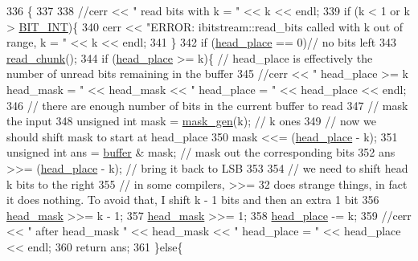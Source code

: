 \begin{DoxyCode}
336                                                 \{
337 
338   \textcolor{comment}{//cerr << " read bits with k = " << k << endl;}
339   \textcolor{keywordflow}{if} (k < 1 or k > \hyperlink{bitstream_8h_afcadf5aa65c5159bfb96c4d82ebc0a5d}{BIT\_INT})\{
340     cerr << \textcolor{stringliteral}{"ERROR: ibitstream::read\_bits called with k out of range, k = "} << k << endl;
341   \}
342   \textcolor{keywordflow}{if} (\hyperlink{classibitstream_a7b96359ac1534a5565e6e9b0cc53a0b3}{head\_place} == 0)\textcolor{comment}{// no bits left}
343     \hyperlink{classibitstream_ac62c26004436d83f337f4aeba0895e20}{read\_chunk}();
344   \textcolor{keywordflow}{if} (\hyperlink{classibitstream_a7b96359ac1534a5565e6e9b0cc53a0b3}{head\_place} >= k)\{ \textcolor{comment}{// head\_place is effectively the number of unread bits remaining in the
       buffer}
345     \textcolor{comment}{//cerr << " head\_place >= k head\_mask = " << head\_mask << " head\_place = " << head\_place << endl;}
346     \textcolor{comment}{// there are enough number of bits in the current buffer to read}
347     \textcolor{comment}{// mask the input}
348     \textcolor{keywordtype}{unsigned} \textcolor{keywordtype}{int} mask = \hyperlink{bitstream_8cpp_a6364b017a9400a38f7a994376bb3ebee}{mask\_gen}(k); \textcolor{comment}{// k ones}
349     \textcolor{comment}{// now we should shift mask to start at head\_place}
350     mask <<= (\hyperlink{classibitstream_a7b96359ac1534a5565e6e9b0cc53a0b3}{head\_place} - k);
351     \textcolor{keywordtype}{unsigned} \textcolor{keywordtype}{int} ans = \hyperlink{classibitstream_a73f0b24d3d4402369f1abbb43f7f70ef}{buffer} & mask; \textcolor{comment}{// mask out the corresponding bits}
352     ans >>= (\hyperlink{classibitstream_a7b96359ac1534a5565e6e9b0cc53a0b3}{head\_place} - k); \textcolor{comment}{// bring it back to LSB}
353 
354     \textcolor{comment}{// we need to shift head k bits to the right}
355     \textcolor{comment}{// in some compilers, >>= 32 does strange things, in fact it does nothing. To avoid that, I shift k - 1
       bits and then an extra 1 bit}
356     \hyperlink{classibitstream_a48cd41991b6c29ea5120b53873a72a70}{head\_mask} >>= k - 1;
357     \hyperlink{classibitstream_a48cd41991b6c29ea5120b53873a72a70}{head\_mask} >>= 1;
358     \hyperlink{classibitstream_a7b96359ac1534a5565e6e9b0cc53a0b3}{head\_place} -= k;
359     \textcolor{comment}{//cerr << " after head\_mask " << head\_mask << " head\_place = " << head\_place << endl;}
360     \textcolor{keywordflow}{return} ans;
361   \}\textcolor{keywordflow}{else}\{

\end{DoxyCode}
